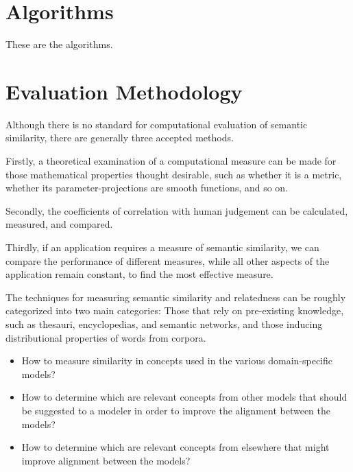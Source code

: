 \documentclass{article}
\begin{document}
\section{Algorithms}

These are the algorithms.

\section{Evaluation Methodology}

Although there is no standard for computational evaluation of semantic similarity, there are generally three accepted methods.\cite{meng2013review}

Firstly, a theoretical examination of a computational measure can be made for those mathematical properties thought desirable, such as whether it is a metric, whether its parameter-projections are smooth functions, and so on. %

Secondly, the coefficients of correlation with human judgement can be calculated, measured, and compared.\cite{zhou2008new,seco2004intrinsic}

Thirdly, if an application requires a measure of semantic similarity, we can compare the performance of different measures, while all other aspects of the application remain constant, to find the most effective measure.\cite{blanchard2006tree,budanitsky2006evaluating}

The techniques for measuring semantic similarity and relatedness can be roughly categorized into two main categories:\cite{agirre2009study} Those that rely on pre-existing knowledge, such as thesauri, encyclopedias, and semantic networks,\cite{alvarez2007graph,yang2005measuring,hughes2007lexical} and those inducing distributional properties of words from corpora.\cite{sahami2006web,chen2006novel,bollegala2007measuring}


\begin{itemize}
\item How to measure similarity in concepts used in the various domain-specific models?
\item How to determine which are relevant concepts from other models that should be suggested to a modeler in order to improve the alignment between the models?
\item How to determine which are relevant concepts from elsewhere that might improve alignment between the models?
\end{itemize}
\end{document}
